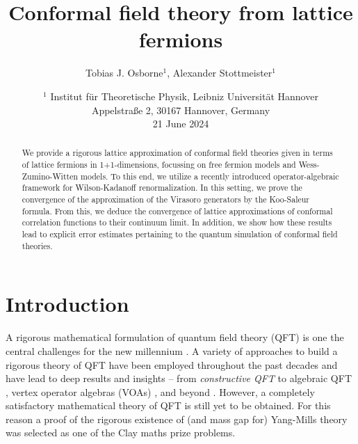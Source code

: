 \documentclass[a4paper, 11pt]{article}
\DeclareMathOperator{\1}{\mathds{1}}
\begin{document}

\title{Conformal field theory from lattice fermions}
\author{Tobias J. Osborne${}^{1}$, Alexander Stottmeister${}^{1}$}
\date{
\small{${}^{1}$ Institut f\"ur Theoretische Physik, Leibniz Universit\"at Hannover
\\Appelstra\ss e 2, 30167 Hannover, Germany} \\[0.5cm]
21 June 2024}
\maketitle
\begin{abstract}
We provide a rigorous lattice approximation of conformal field theories given in terms of lattice fermions in 1+1-dimensions, focussing on free fermion models and Wess-Zumino-Witten models. To this end, we utilize a recently introduced operator-algebraic framework for Wilson-Kadanoff renormalization. In this setting, we prove the convergence of the approximation of the Virasoro generators by the Koo-Saleur formula. From this, we deduce the convergence of lattice approximations of conformal correlation functions to their continuum limit. In addition, we show how these results lead to explicit error estimates pertaining to the quantum simulation of conformal field theories.
\end{abstract}

\tableofcontents

\section{Introduction}
\label{sec:intro}

A rigorous mathematical formulation of quantum field theory (QFT) is one the central challenges for the new millennium \cite{seibergNathanSeiberg20152014}. A variety of approaches to build a rigorous theory of QFT have been employed throughout the past decades and have lead to deep results and insights -- from \emph{constructive QFT} \cite{GlimmQuantumFieldTheory, glimmQuantumPhysicsFunctional1987, SummersAPerspectiveOn} to algebraic QFT \cite{HaagAnAlgebraicApproach, LechnerConstructionOfQuantum, BahnsLocalNetOf}, vertex operator algebras (VOAs) \cite{BorcherdsVertexAlgebrasKac, FrenkelVertexOperatorAlgebras, FrenkelBasicRepresentationsOf, TenerGeometricRealizationOf}, and beyond \cite{segalDefinitionConformalField2004, GrosseSolutionOfThe, GubinelliAPDEConstruction}. However, a completely satisfactory mathematical theory of QFT is still yet to be obtained. For this reason a proof of the rigorous existence of (and mass gap for) Yang-Mills theory was selected as one of the Clay maths prize problems. 
\end{document}
